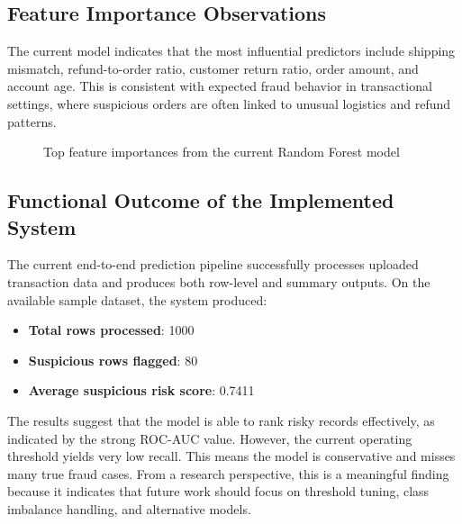 \documentclass[a4paper,12pt]{article}
\begin{document}
\subsection{Feature Importance Observations}
The current model indicates that the most influential predictors include shipping mismatch, refund-to-order ratio, customer return ratio, order amount, and account age. This is consistent with expected fraud behavior in transactional settings, where suspicious orders are often linked to unusual logistics and refund patterns.

\begin{figure}[H]
\centering
{}
\caption{Top feature importances from the current Random Forest model}
\end{figure}

\subsection{Functional Outcome of the Implemented System}
The current end-to-end prediction pipeline successfully processes uploaded transaction data and produces both row-level and summary outputs. On the available sample dataset, the system produced:
\begin{itemize}[noitemsep]
    \item \textbf{Total rows processed}: 1000
    \item \textbf{Suspicious rows flagged}: 80
    \item \textbf{Average suspicious risk score}: 0.7411
\end{itemize}

The results suggest that the model is able to rank risky records effectively, as indicated by the strong ROC-AUC value. However, the current operating threshold yields very low recall. This means the model is conservative and misses many true fraud cases. From a research perspective, this is a meaningful finding because it indicates that future work should focus on threshold tuning, class imbalance handling, and alternative models.
\end{document}
